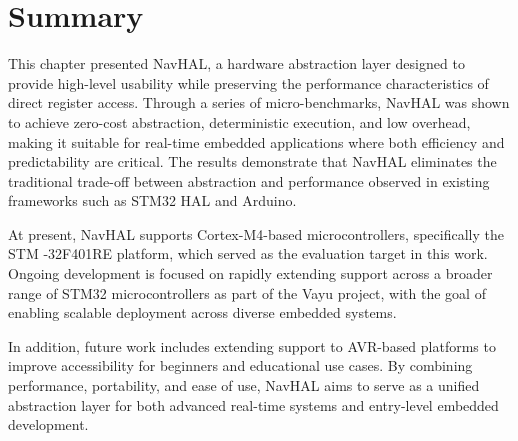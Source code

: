 \section{Summary}
\label{sec:navhal_summary}

This chapter presented NavHAL, a hardware abstraction layer designed to provide high-level usability while preserving the performance characteristics of direct register access. Through a series of micro-benchmarks, NavHAL was shown to achieve zero-cost abstraction, deterministic execution, and low overhead, making it suitable for real-time embedded applications where both efficiency and predictability are critical. The results demonstrate that NavHAL eliminates the traditional trade-off between abstraction and performance observed in existing frameworks such as STM32 HAL and Arduino.

At present, NavHAL supports Cortex-M4-based microcontrollers, specifically the STM -32F401RE platform, which served as the evaluation target in this work. Ongoing development is focused on rapidly extending support across a broader range of STM32 microcontrollers as part of the Vayu project, with the goal of enabling scalable deployment across diverse embedded systems.

In addition, future work includes extending support to AVR-based platforms to improve accessibility for beginners and educational use cases. By combining performance, portability, and ease of use, NavHAL aims to serve as a unified abstraction layer for both advanced real-time systems and entry-level embedded development.